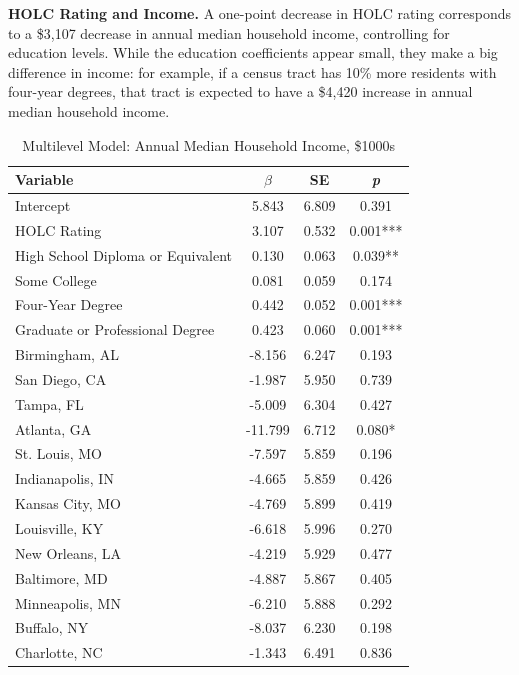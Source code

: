 \documentclass[paper=letter, fontsize=12pt]{scrartcl} %
\begin{document}
\begin{table}
	\textbf{HOLC Rating and Income.} A one-point decrease in HOLC rating corresponds to a \$3,107 decrease in annual median household income, controlling for education levels. While the education coefficients appear small, they make a big difference in income: for example, if a census tract has 10\% more residents with four-year degrees, that tract is expected to have a \$4,420 increase in annual median household income.
	\caption{Multilevel Model: Annual Median Household Income, \$1000s}
	\begin{center}
		\begin{tabular}{|| l | c c c ||}
			\hline
			Variable & $\beta$ & SE & \textit{p}\\
			\hline \hline
			Intercept & 5.843 & 6.809 & 0.391\\ 
			\hline 
			HOLC Rating & 3.107 & 0.532 & 0.001***\\ 
			\hline 
			High School Diploma or Equivalent & 0.130 & 0.063 & 0.039**\\ 
			\hline 
			Some College &0.081 & 0.059 & 0.174\\ 
			\hline 
			Four-Year Degree &0.442 & 0.052 & 0.001***\\ 
			\hline 
			Graduate or Professional Degree &0.423 & 0.060 & 0.001***\\ 
			\hline 
			Birmingham, AL & -8.156 & 6.247 & 0.193\\ 
			\hline 
			San Diego, CA & -1.987 & 5.950 & 0.739\\ 
			\hline 
			Tampa, FL & -5.009 & 6.304 & 0.427\\ 
			\hline 
			Atlanta, GA & -11.799 & 6.712 & 0.080*\\ 
			\hline 
			St. Louis, MO & -7.597 & 5.859 & 0.196\\ 
			\hline 
			Indianapolis, IN & -4.665 & 5.859 & 0.426\\ 
			\hline 
			Kansas City, MO & -4.769 & 5.899 & 0.419\\ 
			\hline 
			Louisville, KY & -6.618 & 5.996 & 0.270\\ 
			\hline 
			New Orleans, LA & -4.219 & 5.929 & 0.477\\ 
			\hline 
			Baltimore, MD & -4.887 & 5.867 & 0.405\\ 
			\hline 
			Minneapolis, MN & -6.210 & 5.888 & 0.292\\ 
			\hline 
			Buffalo, NY & -8.037 & 6.230 & 0.198\\ 
			\hline 
			Charlotte, NC & -1.343 & 6.491 & 0.836\\ 

\end{tabular}
\end{center}
\end{table}
\end{document}
